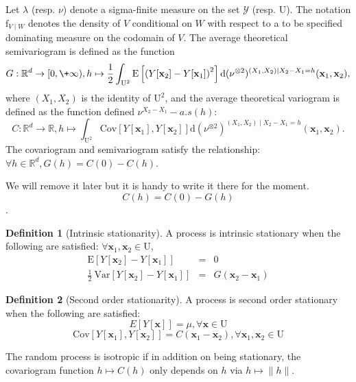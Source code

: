 \documentclass[12pt]{article}
\theoremstyle{definition}
\newtheorem{definition}{Definition}[section]
\theoremstyle{remark}
\newcommand{\dominantU}{\nu}
\newcommand{\dominantY}{\lambda}
\newcommand{\Covariogram}{C}
\newcommand{\Cov}{\mathrm{Cov}}
\newcommand{\derive}{\mathrm{d}}
\newcommand{\E}{\mathrm{E}}
\newcommand{\density}{\mathrm{f}}
\newcommand{\Semivariogram}{G}
\newcommand{\Pop}{\mathrm{U}}
\newcommand{\Var}{\mathrm{Var}}
\newcommand{\position}{\mathbf{x}}
\newcommand{\SignalSpace}{\mathscr{Y}}
\newcommand{\Signal}{Y}
\begin{document}
Let $\dominantY$ (resp. $\dominantU$) denote a sigma-finite measure on the set $\SignalSpace$ (resp. $\Pop$).
The notation $\density_{V\mid W}$ denotes the density of $V$ conditional on $W$ with respect to a to be specified dominating measure on the codomain of $V$.
The average theoretical semivariogram is defined as the function $$\Semivariogram:\mathbb{R}^d\to[0,\+\infty),h\mapsto\frac12\int_{\Pop^2} \E\left[\left(\Signal[\position_2]-\Signal[\position_1]\right)^2\right] \derive(\dominantU^{\otimes 2})^{(X_1,X_2)\mid X_2-X_1=h}(\position_1,\position_2),$$
where $(X_1,X_2)$ is the identity of $\Pop^{2}$, and the average theoretical variogram is defined as the function defined $\nu^{X_2-X_1}-a.s(h)$:
$$\Covariogram:\mathbb{R}^d\to\mathbb{R}, h\mapsto\int_{\Pop^2} \Cov\left[\Signal[\position_1],\Signal[\position_2]\right] \derive(\dominantU^{\otimes 2})^{(X_1,X_2)\mid X_2-X_1=h}(\position_1,\position_2).$$ The covariogram and semivariogram satisfy the relationship: $\forall h\in\mathbb{R}^d, \Semivariogram(h)=\Covariogram(0)-\Covariogram(h)$.

{\color{red}We will remove it later but it is handy to write it there for the moment. $$\Covariogram(h)=\Covariogram(0)-\Semivariogram(h)$$.}

\begin{definition}[Intrinsic stationarity]
A process is intrinsic stationary when the following are satisfied:  $\forall \position_1,\position_2\in\Pop$,
\begin{eqnarray}
    \mathrm{E}\left[\Signal\left[\position_2\right]-\Signal\left[\position_1\right]\right]&=&0\\
    \frac12~\Var\left[\Signal\left[\position_2\right]-\Signal\left[\position_1\right]\right]&=&\Semivariogram(\position_2-\position_1)\label{eq:semivariogram}
\end{eqnarray}


\end{definition}


\begin{definition}[Second order stationarity]
A process is second order stationary when the following are satisfied:
\begin{equation}
    E\left[\Signal\left[\position\right]\right]=\mu,\forall\position\in \Pop
\end{equation}
\begin{equation} \label{eq:covariogram}
    \Cov\left[\Signal\left[\position_{1}\right],\Signal\left[\position_{2}\right]\right]=C\left(\position_{1}-\position_{2}\right),\forall\position_{1},\position_{2}\in \Pop
\end{equation}
\end{definition}
The random process is isotropic if in addition on being stationary, the covariogram function $h\mapsto \Covariogram(h)$ only depends on $h$ via $h\mapsto\|h\|$.
\end{document}
